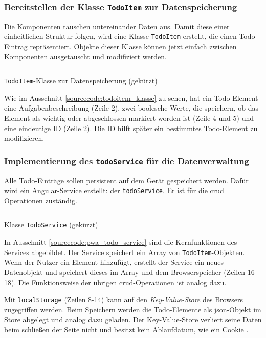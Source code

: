 \subsubsection{Bereitstellen der Klasse \texttt{TodoItem} zur Datenspeicherung}

Die Komponenten tauschen untereinander Daten aus. Damit diese einer einheitlichen Struktur folgen, wird eine Klasse \texttt{TodoItem} erstellt, die einen Todo-Eintrag repräsentiert. Objekte dieser Klasse können jetzt einfach zwischen Komponenten ausgetauscht und modifiziert werden.

\begin{listing}[h!]
	\inputminted{TypeScript}{sourcecode/pwa_todoitem_klasse.js}
	\caption{\texttt{TodoItem}-Klasse zur Datenspeicherung (gekürzt)}
	\label{sourcecode:todoitem_klasse}
\end{listing}

Wie im Ausschnitt \ref{sourcecode:todoitem_klasse} zu sehen, hat ein Todo-Element eine Aufgabenbeschreibung (Zeile 2), zwei boolesche Werte, die speichern, ob das Element als wichtig oder abgeschlossen markiert worden ist (Zeile 4 und 5) und eine eindeutige ID (Zeile 2). Die ID hilft später ein bestimmtes Todo-Element zu modifizieren.

\subsubsection{Implementierung des \texttt{todoService} für die Datenverwaltung}
Alle Todo-Einträge sollen persistent auf dem Gerät gespeichert werden. Dafür wird ein Angular-Service erstellt: der \texttt{todoService}. Er ist für die \acf{crud} Operationen zuständig.

\begin{listing}[h!]
	\inputminted{TypeScript}{sourcecode/pwa_todo_service.ts}
	\caption{Klasse \texttt{TodoService} (gekürzt)}
	\label{sourcecode:pwa_todo_service}
\end{listing}

In Ausschnitt \ref{sourcecode:pwa_todo_service} sind die Kernfunktionen des Services abgebildet. Der Service speichert ein Array von \texttt{TodoItem}-Objekten. Wenn der Nutzer ein Element hinzufügt, erstellt der Service ein neues Datenobjekt und speichert dieses im Array und dem Browserspeicher (Zeilen 16-18). Die Funktionsweise der übrigen \ac{crud}-Operationen ist analog dazu.

Mit \texttt{localStorage} (Zeilen 8-14) kann auf den\textit{ Key-Value-Store} des Browsers zugegriffen werden. Beim Speichern werden die Todo-Elemente als \ac{json}-Objekt im Store abgelegt und analog dazu geladen. Der Key-Value-Store verliert seine Daten beim schließen der Seite nicht und besitzt kein Ablaufdatum, wie ein Cookie \cite{LocalStorage}.

